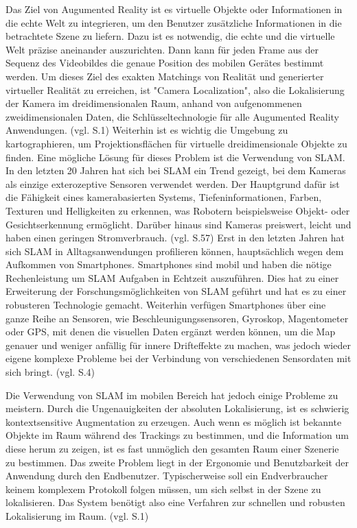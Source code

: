 Das Ziel von Augumented Reality ist es virtuelle Objekte oder Informationen in die echte Welt zu integrieren, um den Benutzer zusätzliche Informationen in die betrachtete Szene zu liefern. Dazu ist es notwendig, die echte und die virtuelle Welt präzise aneinander auszurichten. Dann kann für jeden Frame aus der Sequenz des Videobildes die genaue Position des mobilen Gerätes bestimmt werden. Um dieses Ziel des exakten Matchings von Realität und generierter virtueller Realität zu erreichen, ist "Camera Localization", also die Lokalisierung der Kamera im dreidimensionalen Raum, anhand von aufgenommenen zweidimensionalen Daten, die Schlüsseltechnologie für alle Augumented Reality Anwendungen. (vgl. \cite{slam_mobile} S.1) Weiterhin ist es wichtig die Umgebung zu kartographieren, um Projektionsflächen für virtuelle dreidimensionale Objekte zu finden. Eine mögliche Lösung für dieses Problem ist die Verwendung von SLAM. In den letzten 20 Jahren hat sich bei SLAM ein Trend gezeigt, bei dem Kameras als einzige exterozeptive Sensoren verwendet werden. Der Hauptgrund dafür ist die Fähigkeit eines kamerabasierten Systems, Tiefeninformationen, Farben, Texturen und Helligkeiten zu erkennen, was Robotern beispielsweise Objekt- oder Gesichtserkennung ermöglicht. Darüber hinaus sind Kameras preiswert, leicht und haben einen geringen Stromverbrauch. (vgl. \cite{survey} S.57) Erst in den letzten Jahren hat sich SLAM in Alltagsanwendungen profilieren können, hauptsächlich wegen dem Aufkommen von Smartphones. Smartphones sind mobil und haben die nötige Rechenleistung um SLAM Aufgaben in Echtzeit auszuführen. Dies hat zu einer Erweiterung der Forschungsmöglichkeiten von SLAM geführt und hat es zu einer robusteren Technologie gemacht. Weiterhin verfügen Smartphones über eine ganze Reihe an Sensoren, wie Beschleunigungssensoren, Gyroskop, Magentometer oder GPS, mit denen die visuellen Daten ergänzt werden können, um die Map genauer und weniger anfällig für innere Drifteffekte zu machen, was jedoch wieder eigene komplexe Probleme bei der Verbindung von verschiedenen Sensordaten mit sich bringt. (vgl. \cite{ar_slam} S.4) 

Die Verwendung von SLAM im mobilen Bereich hat jedoch einige Probleme zu meistern. Durch die Ungenauigkeiten der absoluten Lokalisierung, ist es schwierig kontextsensitive Augmentation zu erzeugen. Auch wenn es möglich ist bekannte Objekte im Raum während des Trackings zu bestimmen, und die Information um diese herum zu zeigen, ist es fast unmöglich den gesamten Raum einer Szenerie zu bestimmen. Das zweite Problem liegt in der Ergonomie und Benutzbarkeit der Anwendung durch den Endbenutzer. Typischerweise soll ein Endverbraucher keinem komplexem Protokoll folgen müssen, um sich selbst in der Szene zu lokalisieren. Das System benötigt also eine Verfahren zur schnellen und robusten Lokalisierung im Raum. (vgl. \cite{slam_mobile} S.1)



